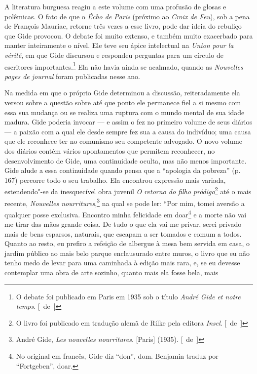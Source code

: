 A literatura burguesa reagiu a este volume com uma profusão de glosas e
polêmicas. O fato de que o \emph{Écho de Paris} (próximo ao \emph{Croix de Feu}), sob a pena de François Mauriac, retorne três vezes a esse
livro, pode dar ideia do rebuliço que Gide provocou. O debate foi muito
extenso, e também muito exacerbado para manter inteiramente o nível. Ele
teve seu ápice intelectual na \emph{Union pour la vérité}, em que Gide
discursou e respondeu perguntas para um círculo de escritores
importantes.\footnote{O debate foi publicado em Paris em 1935 sob o
  título \emph{André Gide et notre temps}. [~de~]} Ela não havia ainda se
acalmado, quando as \emph{Nouvelles pages de journal} foram publicadas
nesse ano.

Na medida em que o próprio Gide determinou a discussão, reiteradamente
ela versou sobre a questão sobre até que ponto ele permanece fiel a si
mesmo com essa sua mudança ou se realiza uma ruptura com o mundo mental
de sua idade madura. Gide poderia invocar --- e assim o fez no primeiro
volume de seus diários --- a paixão com a qual ele desde sempre fez sua a
causa do indivíduo; uma causa que ele reconhece ter no comunismo seu
competente advogado. O novo volume dos diários contém vários apontamentos que
permitem reconhecer, no desenvolvimento de Gide, uma continuidade oculta, mas não menos importante. Gide alude a essa continuidade quando pensa
que a ``apologia da pobreza'' (p. 167) percorre todo o seu trabalho.
Ela encontrou expressão mais variada, estendendo"-se da inesquecível obra
juvenil \emph{O retorno do filho pródigo}\footnote{O livro foi
  publicado em tradução alemã de Rilke pela editora \emph{Insel}. [~de~]} até o
mais recente, \emph{Nouvelles nourritures},\footnote{André Gide,
  \emph{Les nouvelles nourritures}. {[}Paris{]} (1935). [~de~]} na qual
se pode ler: ``Por mim, tomei aversão a qualquer posse exclusiva.
Encontro minha felicidade em doar\footnote{No original em
  francês, Gide diz ``don'', dom. Benjamin traduz por ``Fortgeben'',
  doar. \versal{[N. T.]}} e a morte não vai me tirar das mãos grande coisa. De tudo o que
ela vai me privar, serei privado mais de bens esparsos, naturais, que
escapam a ser tomados e comum a todos. Quanto ao resto, eu prefiro a
refeição de albergue à mesa bem servida em casa, o jardim público ao
mais belo parque enclausurado entre muros, o livro que eu não tenho medo
de levar para uma caminhada à edição mais rara, e, se eu devesse
contemplar uma obra de arte sozinho, quanto mais ela fosse bela, mais
